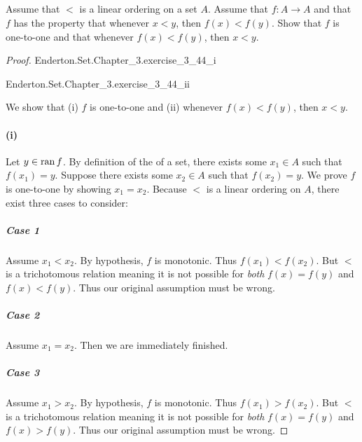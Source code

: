 \documentclass{report}
\begin{document}
\subsection{}%

Assume that $<$ is a linear ordering on a set $A$.
Assume that $f \colon A \rightarrow A$ and that $f$ has the property that
  whenever $x < y$, then $f(x) < f(y)$.
Show that $f$ is one-to-one and that whenever $f(x) < f(y)$, then $x < y$.

\begin{proof}

  \statementpadding

    {Enderton.Set.Chapter\_3.exercise\_3\_44\_i}

    {Enderton.Set.Chapter\_3.exercise\_3\_44\_ii}

  We show that (i) $f$ is one-to-one and (ii) whenever $f(x) < f(y)$, then
    $x < y$.

  \paragraph{(i)}%

    Let $y \in \mathop{\text{ran}}{f}$.
    By definition of the  of a set, there exists some
      $x_1 \in A$ such that $f(x_1) = y$.
    Suppose there exists some $x_2 \in A$ such that $f(x_2) = y$.
    We prove $f$ is one-to-one by showing $x_1 = x_2$.
    Because $<$ is a linear ordering on $A$, there exist three cases to
      consider:

    \subparagraph{Case 1}%

      Assume $x_1 < x_2$.
      By hypothesis, $f$ is monotonic.
      Thus $f(x_1) < f(x_2)$.
      But $<$ is a trichotomous relation meaning it is not possible for
        \textit{both} $f(x) = f(y)$ and $f(x) < f(y)$.
      Thus our original assumption must be wrong.

    \subparagraph{Case 2}%

      Assume $x_1 = x_2$.
      Then we are immediately finished.

    \subparagraph{Case 3}%

      Assume $x_1 > x_2$.
      By hypothesis, $f$ is monotonic.
      Thus $f(x_1) > f(x_2)$.
      But $<$ is a trichotomous relation meaning it is not possible for
        \textit{both} $f(x) = f(y)$ and $f(x) > f(y)$.
      Thus our original assumption must be wrong.


\end{proof}
\end{document}
